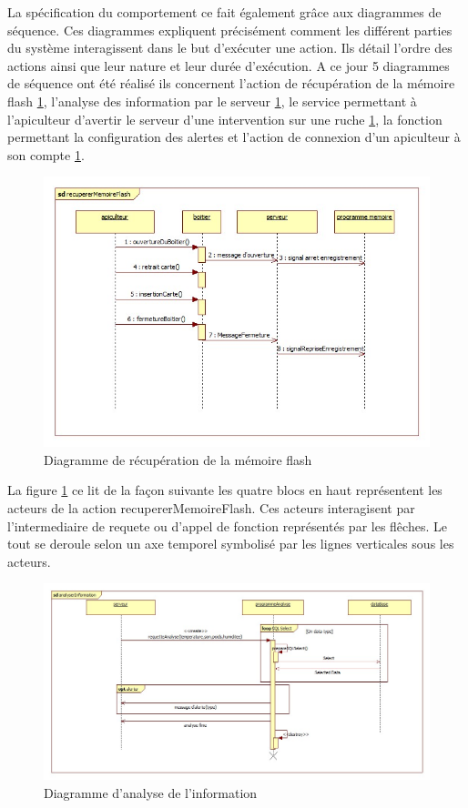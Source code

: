 La spécification du comportement ce fait également grâce aux diagrammes de séquence. Ces diagrammes expliquent précisément comment les différent parties du système interagissent dans le but d'exécuter une action. Ils détail l'ordre des actions ainsi que leur nature et leur durée d'exécution. A ce jour 5 diagrammes de séquence ont été réalisé ils concernent l'action de récupération de la mémoire flash \ref{fig:seq1}, l'analyse des information par le serveur \ref{fig:seq1}, le service permettant à l'apiculteur d'avertir le serveur d'une intervention sur une ruche \ref{fig:seq1}, la fonction permettant la configuration des alertes et l'action de connexion d'un apiculteur à son compte \ref{fig:seq1}.
\begin{figure}[h!]
\centering\includegraphics[scale=0.7]{recupererMemoireFlash.jpg}
\caption{\label{fig:seq1} Diagramme de récupération de la mémoire flash}
\end{figure}
La figure \ref{fig:seq1} ce lit de la façon suivante les quatre blocs en haut représentent les acteurs de la action recupererMemoireFlash. Ces acteurs interagisent par l'intermediaire de requete ou d'appel de fonction représentés par les flêches. Le tout se deroule selon un axe temporel symbolisé par les lignes verticales sous les acteurs.
\begin{figure}[h!]
\centering\includegraphics[scale=0.5]{analyserInformation.jpg}
\caption{\label{fig:seq2} Diagramme d'analyse de l'information}
\end{figure}
